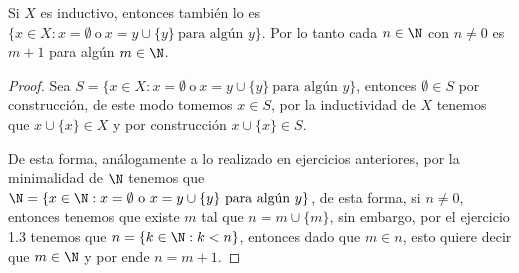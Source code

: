 \begin{exercise}[1.8]
  Si $X$ es inductivo, entonces también lo es $\{x \in X : x = \emptyset \ \text{o} \ x = y \cup \{y\} \ \text{para algún $y$}\}$. Por lo tanto cada $n \in \N$ con $n \neq 0$ es $m + 1$ para algún $m \in \N$.
\end{exercise}
\begin{proof}
  Sea $S = \{x \in X : x = \emptyset \ \text{o} \ x = y \cup \{y\} \ \text{para algún $y$}\}$, entonces $\emptyset \in S$ por construcción, de este modo tomemos $x \in S$, por la inductividad de $X$ tenemos que $x \cup\{x\} \in X$ y por construcción $x \cup\{x\} \in S$.

  De esta forma, análogamente a lo realizado en ejercicios anteriores, por la minimalidad de $\N$ tenemos que $\N = \{x \in \N : x = \emptyset \ \text{o} \ x = y \cup \{y\} \ \text{para algún $y$}\}$, de esta forma, si $n \neq 0$, entonces tenemos que existe $m$ tal que $n = m \cup\{m\}$, sin embargo, por el ejercicio 1.3 tenemos que $n = \{k \in \N : k < n\}$, entonces dado que $m \in n$, esto quiere decir que $m \in \N$ y por ende $n = m+1$.
\end{proof}